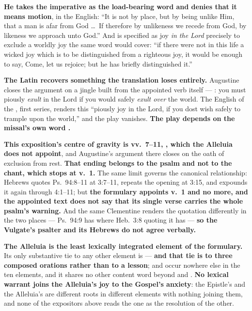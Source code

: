 \begin{witnessnote}
 \textbf{He takes the imperative  as the load-bearing
word and denies that it means motion}, in the  English: ``It is not by place, but by being unlike
Him, that a man is afar from God \dots\ If therefore by unlikeness we recede
from God, by likeness we approach unto God.'' And  is
specified as joy \emph{in the Lord} precisely to exclude a worldly joy the same
word would cover: ``if there were not in this life a wicked joy which is to be
distinguished from a righteous joy, it would be enough to say, Come, let us
rejoice; but he has briefly distinguished it.''
\end{witnessnote}

\textbf{The Latin recovers something the translation loses entirely.} Augustine
closes the argument on a jingle built from the appointed verb itself ---
: you must
piously \emph{exult} in the Lord if you would safely \emph{exult over} the world.
The English of the , first series, renders
this ``piously joy in the Lord, if you dost wish safely to
trample upon the world,'' and the play vanishes. \textbf{The play depends on the
missal's own word .}

\textbf{This exposition's centre of gravity is vv.~7--11,
, which the Alleluia does not
appoint}, and Augustine's argument there closes on the oath of exclusion from
rest. \textbf{That ending belongs to the psalm and not to the chant, which stops
at v.~1.} The same limit governs
the canonical relationship: Hebrews quotes Ps.\ 94:8--11 at 3:7--11, repeats the
opening at 3:15, and expounds it again through 4:1--11;
but \textbf{the formulary appoints v.~1 and no more, and the appointed text does
not say that its single verse carries the whole psalm's warning.} And the same
Clementine renders the quotation differently in the two places --- Ps.\ 94:9 has
 where Heb.\ 3:8 quoting it has  ---
\textbf{so the Vulgate's psalter and its Hebrews do not agree verbally.}

\textbf{The Alleluia is the least lexically integrated element of the
formulary.} Its only
substantive tie to any other element is  --- \textbf{and that
tie is to three composed orations rather than to a lesson};  and
 occur nowhere else in the ten elements, and it shares no other
content word beyond  and . \textbf{No lexical warrant joins the
Alleluia's joy to the Gospel's anxiety}: the Epistle's  and the
Alleluia's 
are different roots in different elements with nothing joining them, and none
of the expositors above reads the one as the resolution of the other.

